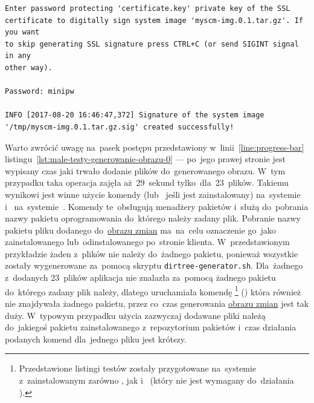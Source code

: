 \documentclass[thesis]{subfiles}
\begin{document}
\begin{minipage}{\linewidth}
\begin{lstlisting}
Enter password protecting 'certificate.key' private key of the SSL
certificate to digitally sign system image 'myscm-img.0.1.tar.gz'. If you want
to skip generating SSL signature press CTRL+C (or send SIGINT signal in any
other way).

Password: minipw

INFO [2017-08-20 16:46:47,372] Signature of the system image '/tmp/myscm-img.0.1.tar.gz.sig' created successfully!
\end{lstlisting}
\end{minipage}

Warto zwrócić uwagę na~pasek postępu przedstawiony w~linii~\ref{line:progress-bar} listingu~\ref{lst:male-testy-generowanie-obrazu-0} --- po~jego prawej stronie jest wypisany czas jaki trwało dodanie plików do~generowanego obrazu. W~tym przypadku taka operacja zajęła aż~29~sekund tylko~dla~23~plików. Takiemu wynikowi jest winne użycie komendy  (lub~ jeśli jest zainstalowany) na~systemie \debian{} i~ na~systemie~\arch{}. Komendy te~obsługują menadżery pakietów i~służą do~pobrania nazwy pakietu oprogramowania do~którego należy zadany plik. Pobranie nazwy pakietu pliku dodanego do~\hyperref[sec:obraz-zmian-konfiguracji]{obrazu zmian} ma~na~celu oznaczenie go~jako zainstalowanego lub~odinstalowanego po~stronie klienta. W~przedstawionym przykładzie żaden z~plików nie należy do~żadnego pakietu, ponieważ wszystkie zostały wygenerowane za~pomocą skryptu \texttt{dirtree-generator.sh}. Dla~żadnego z~dodanych 23~plików aplikacja nie znalazła za~pomocą  żadnego pakietu do~którego zadany plik należy, dlatego uruchamiała komendę \footnote{Przedstawione listingi testów zostały przygotowane na~systemie \debian{} z~zainstalowanym zarówno , jak i~ (który nie jest wymagany do~działania \texttt{\srvappname{}}).} () która również nie znajdywała żadnego pakietu, przez co~czas generowania \hyperref[sec:obraz-zmian-konfiguracji]{obrazu zmian} jest tak duży. W~typowym przypadku użycia \texttt{\srvappname{}} zazwyczaj dodawane pliki należą do~jakiegoś pakietu zainstalowanego z~repozytorium pakietów i~czas działania podanych komend dla~jednego pliku jest krótszy.
\end{document}
